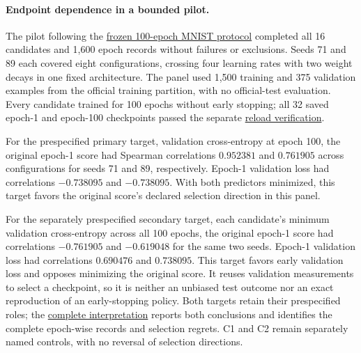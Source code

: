 \paragraph{Endpoint dependence in a bounded pilot.}
The pilot following the \href{run:../sweep-results/research-audit-20261002/long-endpoint-pilot/run-prepared-20261002-v1/protocol.json}{frozen 100-epoch MNIST protocol} completed all 16 candidates and 1,600 epoch records without failures or exclusions. Seeds 71 and 89 each covered eight configurations, crossing four learning rates with two weight decays in one fixed architecture. The panel used 1,500 training and 375 validation examples from the official training partition, with no official-test evaluation. Every candidate trained for 100 epochs without early stopping; all 32 saved epoch-1 and epoch-100 checkpoints passed the separate \href{run:../sweep-results/research-audit-20261002/long-endpoint-pilot/run-prepared-20261002-v1/checkpoint-verification/summary.json}{reload verification}.

For the prespecified primary target, validation cross-entropy at epoch 100, the original epoch-1 score had Spearman correlations $0.952381$ and $0.761905$ across configurations for seeds 71 and 89, respectively. Epoch-1 validation loss had correlations $-0.738095$ and $-0.738095$. With both predictors minimized, this target favors the original score's declared selection direction in this panel.

For the separately prespecified secondary target, each candidate's minimum validation cross-entropy across all 100 epochs, the original epoch-1 score had correlations $-0.761905$ and $-0.619048$ for the same two seeds. Epoch-1 validation loss had correlations $0.690476$ and $0.738095$. This target favors early validation loss and opposes minimizing the original score. It reuses validation measurements to select a checkpoint, so it is neither an unbiased test outcome nor an exact reproduction of an early-stopping policy. Both targets retain their prespecified roles; the \href{run:../sweep-results/research-audit-20261002/long-endpoint-pilot/run-prepared-20261002-v1/interpretation.txt}{complete interpretation} reports both conclusions and identifies the complete epoch-wise records and selection regrets. C1 and C2 remain separately named controls, with no reversal of selection directions.

